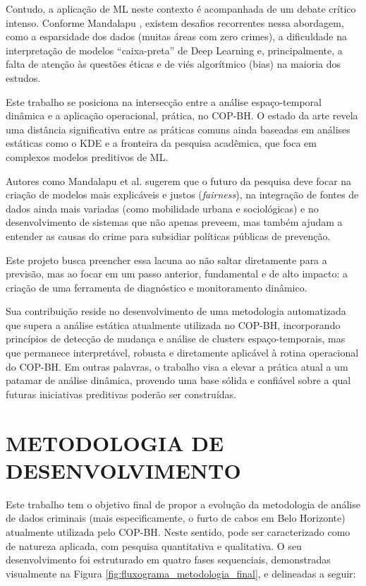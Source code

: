 Contudo, a aplicação de ML neste contexto é acompanhada de um debate crítico intenso. Conforme Mandalapu \cite{Mandalapu2023}, existem desafios recorrentes nessa abordagem, como a esparsidade dos dados (muitas áreas com zero crimes), a dificuldade na interpretação de modelos ``caixa-preta'' de Deep Learning e, principalmente, a falta de atenção às questões éticas e de viés algorítmico (bias) na maioria dos estudos.

Este trabalho se posiciona na intersecção entre a análise espaço-temporal dinâmica e a aplicação operacional, prática, no COP-BH. O estado da arte revela uma distância significativa entre as práticas comuns ainda baseadas em análises estáticas como o KDE e a fronteira da pesquisa acadêmica, que foca em complexos modelos preditivos de ML. 

Autores como Mandalapu et al. \cite{Mandalapu2023} sugerem que o futuro da pesquisa deve focar na criação de modelos mais explicáveis e justos (\textit{fairness}), na integração de fontes de dados ainda mais variadas (como mobilidade urbana e sociológicas) e no desenvolvimento de sistemas que não apenas preveem, mas também ajudam a entender as causas do crime para subsidiar políticas públicas de prevenção.

Este projeto busca preencher essa lacuna ao não saltar diretamente para a previsão, mas ao focar em um passo anterior, fundamental e de alto impacto: a criação de uma ferramenta de diagnóstico e monitoramento dinâmico. 

Sua contribuição reside no desenvolvimento de uma metodologia automatizada que supera a análise estática atualmente utilizada no COP-BH, incorporando princípios de detecção de mudança e análise de clusters espaço-temporais, mas que permanece interpretável, robusta e diretamente aplicável à rotina operacional do COP-BH. Em outras palavras, o trabalho visa a elevar a prática atual a um patamar de análise dinâmica, provendo uma base sólida e confiável sobre a qual futuras iniciativas preditivas poderão ser construídas.

\section{METODOLOGIA DE DESENVOLVIMENTO}
\label{sec:metodologia}
Este trabalho tem o objetivo final de propor a evolução da metodologia de análise de dados criminais (mais especificamente, o furto de cabos em Belo Horizonte) atualmente utilizada pelo COP-BH. Neste sentido, pode ser caracterizado como de natureza aplicada, com pesquisa quantitativa e qualitativa. O seu desenvolvimento foi estruturado em quatro fases sequenciais, demonstradas visualmente na Figura \ref{fig:fluxograma_metodologia_final}, e delineadas a seguir:

